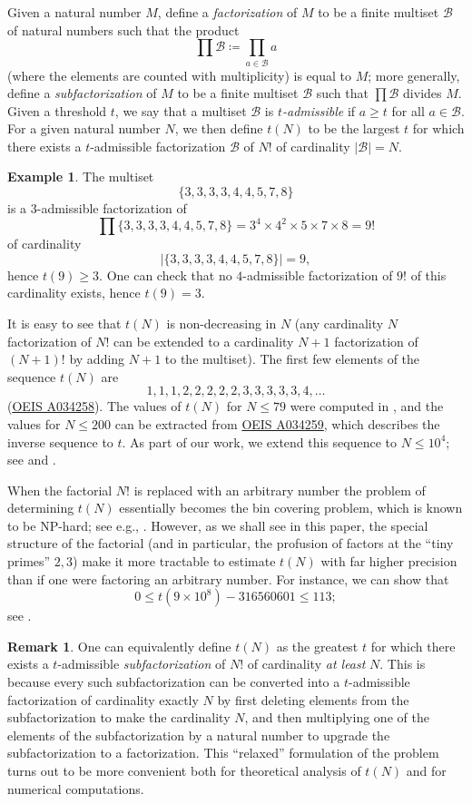 \documentclass[12pt,a4paper,reqno]{amsart}
\numberwithin{equation}{section}
\theoremstyle{plain}
\theoremstyle{definition}
\newtheorem{remark}[theorem]{Remark}
\newtheorem{example}[theorem]{Example}
\newcommand\tuple{{\mathcal B}}
\begin{document}
Given a natural number $M$, define a \emph{factorization} of $M$ to be a finite multiset $\tuple$ of natural numbers such that the product
$$ \prod \tuple \coloneqq \prod_{a \in \tuple} a$$
(where the elements are counted with multiplicity) is equal to $M$; more generally, define a \emph{subfactorization} of $M$ to be a finite multiset $\tuple$ such that $\prod \tuple$ divides $M$.  Given a threshold $t$, we say that a multiset $\tuple$ is \emph{$t$-admissible} if $a \geq t$ for all $a \in \tuple$.  For a given natural number $N$, we then define $t(N)$ to be the largest $t$ for which there exists a $t$-admissible factorization $\tuple$ of $N!$ of cardinality $|\tuple|=N$.  

\begin{example}\label{nine}  The multiset
  $$ \{ 3,3,3,3,4,4,5,7,8\}$$
  is a $3$-admissible factorization of 
$$ \prod \{ 3,3,3,3,4,4,5,7,8\} = 3^4 \times 4^2 \times 5 \times 7 \times 8 = 9!$$
of cardinality 
$$|\{ 3,3,3,3,4,4,5,7,8\}| = 9,$$
 hence $t(9) \geq 3$.  One can check that no $4$-admissible factorization of $9!$ of this cardinality exists, hence $t(9) = 3$.
\end{example}

It is easy to see that $t(N)$ is non-decreasing in $N$ (any cardinality $N$ factorization of $N!$ can be extended to a cardinality $N+1$ factorization of $(N+1)!$ by adding $N+1$ to the multiset).  The first few elements of the sequence $t(N)$ are
$$ 1,1,1,2,2,2,2,2,3,3,3,3,3,4, \dots$$
(\href{https://oeis.org/A034258}{OEIS A034258}). The values of $t(N)$ for $N \leq 79$ were computed in \cite{guy}, and the values for $N \leq 200$ can be extracted from \href{https://oeis.org/A034259}{OEIS A034259}, which describes the inverse sequence to $t$.  As part of our work, we extend this sequence to $N \leq 10^4$; see \cite{github} and .

When the factorial $N!$ is replaced with an arbitrary number the problem of determining $t(N)$ essentially becomes the bin covering problem, which is known to be NP-hard; see e.g., \cite{bincover}.  However, as we shall see in this paper, the special structure of the factorial (and in particular, the profusion of factors at the ``tiny primes'' $2,3$) make it more tractable to estimate $t(N)$ with far higher precision than if one were factoring an arbitrary number.  For instance, we can show that
$$ 0 \leq t(9 \times 10^8) - \num{316560601} \leq 113;$$
see .

\begin{remark}\label{subfac}  One can equivalently define $t(N)$ as the greatest $t$ for which there exists a $t$-admissible \emph{subfactorization} of $N!$ of cardinality \emph{at least} $N$.  This is because every such subfactorization can be converted into a $t$-admissible factorization of cardinality exactly $N$ by first deleting elements from the subfactorization to make the cardinality $N$, and then multiplying one of the elements of the subfactorization by a natural number to upgrade the subfactorization to a factorization.  This ``relaxed'' formulation of the problem turns out to be more convenient both for theoretical analysis of $t(N)$ and for numerical computations.
\end{remark}
\end{document}
